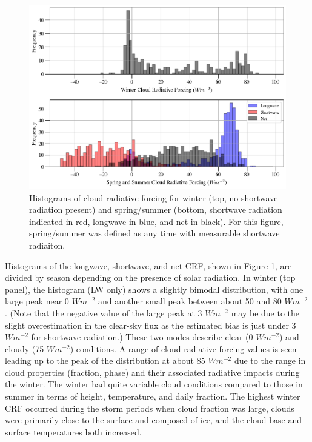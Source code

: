 \begin{figure}[t!]
    \centering
    \includegraphics[width=1\linewidth]{figures/chapter4/ForcingValues.png}
    \caption[Histograms of cloud radiative forcing by season.]{Histograms of cloud radiative forcing for winter (top, no shortwave radiation present) and spring/summer (bottom, shortwave radiation indicated in red, longwave in blue, and net in black). For this figure, spring/summer was defined as any time with measurable shortwave radiaiton.}
    \label{fig:crf_histo}
\end{figure}

Histograms of the longwave, shortwave, and net CRF, shown in Figure \ref{fig:crf_histo}, are divided by season depending on the presence of solar radiation. In winter (top panel), the histogram (LW only) shows a slightly bimodal distribution, with one large peak near 0 $W m^{-2}$ and another small peak between about 50 and 80 $W m^{-2}$. (Note that the negative value of the large peak at 3 $W m^{-2}$ may be due to the slight overestimation in the clear-sky flux as the estimated bias is just under 3 $Wm^{-2}$ for shortwave radiation.) These two modes describe clear (0 $W m^{-2}$) and cloudy (75 $W m^{-2}$) conditions. A range of cloud radiative forcing values is seen leading up to the peak of the distribution at about 85 $W m^{-2}$ due to the range in cloud properties (fraction, phase) and their associated radiative impacts during the winter. The winter had quite variable cloud conditions compared to those in summer in terms of height, temperature, and daily fraction. The highest winter CRF occurred during the storm periods when cloud fraction was large, clouds were primarily close to the surface and composed of ice, and the cloud base and surface temperatures both increased.  

